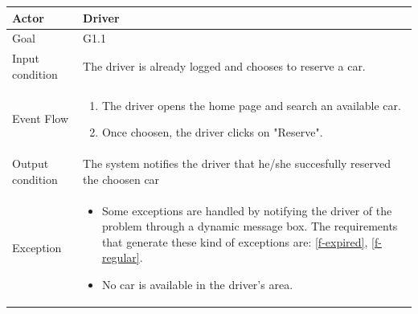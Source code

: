 
\begin{table}[H]
	\begin{center}
		\begin{tabular}{| l | p{} |}
			\hline
			Actor & Driver \\
			\hline
			Goal & G1.1
			\\
			\hline
			Input condition & The driver is already logged and chooses to reserve a car.  \\
			\hline
			Event Flow & \begin{enumerate}
				\item The driver opens the home page and search an available car.
				\item Once choosen, the driver clicks on "Reserve".
			\end{enumerate}
			\\
			\hline
			Output condition & The system notifies the driver that he/she succesfully reserved the choosen car \\
			\hline
			
			Exception &  \begin{itemize}
				\item Some exceptions are handled by notifying the driver of the problem through a dynamic message box.				
				The requirements that generate these kind of exceptions are:
				\ref{f-expired},    %
				\ref{f-regular}.    %
				\item No car is available in the driver's area.
				\end{itemize}
			\\
			\hline
		\end{tabular}
	\end{center}
\end{table}

